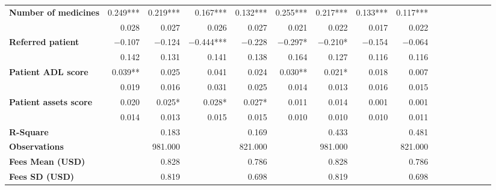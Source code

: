 \begin{tabular}{@{\extracolsep{5pt}}lrrrrrrrrrrrrrrr}
{\bf Number of medicines} & 0.249*** & 0.219*** & 0.167*** & 0.132*** & 0.255*** & 0.217*** & 0.133*** & 0.117*** \\
{\bf } & 0.028\phantom{***} & 0.027\phantom{***} & 0.026\phantom{***} & 0.027\phantom{***} & 0.021\phantom{***} & 0.022\phantom{***} & 0.017\phantom{***} & 0.022\phantom{***} \\
{\bf Referred patient} & $-$0.107\phantom{***} & $-$0.124\phantom{***} & $-$0.444*** & $-$0.228\phantom{***} & $-$0.297*\phantom{**} & $-$0.210*\phantom{**} & $-$0.154\phantom{***} & $-$0.064\phantom{***} \\
{\bf } & 0.142\phantom{***} & 0.131\phantom{***} & 0.141\phantom{***} & 0.138\phantom{***} & 0.164\phantom{***} & 0.127\phantom{***} & 0.116\phantom{***} & 0.116\phantom{***} \\
{\bf Patient ADL score} & 0.039**\phantom{*} & 0.025\phantom{***} & 0.041\phantom{***} & 0.024\phantom{***} & 0.030**\phantom{*} & 0.021*\phantom{**} & 0.018\phantom{***} & 0.007\phantom{***} \\
{\bf } & 0.019\phantom{***} & 0.016\phantom{***} & 0.031\phantom{***} & 0.025\phantom{***} & 0.014\phantom{***} & 0.013\phantom{***} & 0.016\phantom{***} & 0.015\phantom{***} \\
{\bf Patient assets score} & 0.020\phantom{***} & 0.025*\phantom{**} & 0.028*\phantom{**} & 0.027*\phantom{**} & 0.011\phantom{***} & 0.014\phantom{***} & 0.001\phantom{***} & 0.001\phantom{***} \\
{\bf } & 0.014\phantom{***} & 0.013\phantom{***} & 0.015\phantom{***} & 0.015\phantom{***} & 0.010\phantom{***} & 0.010\phantom{***} & 0.010\phantom{***} & 0.011\phantom{***} \\
{\bf R-Square} & \phantom{***} & 0.183\phantom{***} & \phantom{***} & 0.169\phantom{***} & \phantom{***} & 0.433\phantom{***} & \phantom{***} & 0.481\phantom{***} \\
{\bf Observations} & \phantom{***} & 981.000\phantom{***} & \phantom{***} & 821.000\phantom{***} & \phantom{***} & 981.000\phantom{***} & \phantom{***} & 821.000\phantom{***} \\
{\bf Fees Mean (USD)} & \phantom{***} & 0.828\phantom{***} & \phantom{***} & 0.786\phantom{***} & \phantom{***} & 0.828\phantom{***} & \phantom{***} & 0.786\phantom{***} \\
{\bf Fees SD (USD)} & \phantom{***} & 0.819\phantom{***} & \phantom{***} & 0.698\phantom{***} & \phantom{***} & 0.819\phantom{***} & \phantom{***} & 0.698\phantom{***} \\
\hline
\end{tabular}
